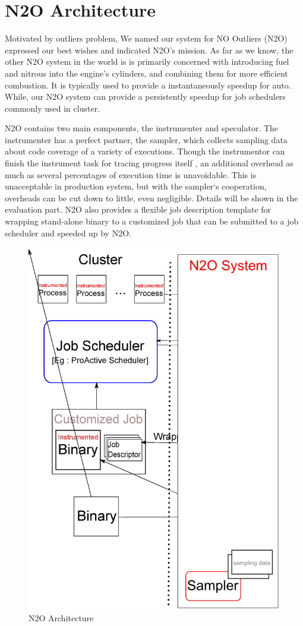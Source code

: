 \section{N2O Architecture}

Motivated by outliers problem, We named our system for NO Outliers (N2O) expressed our best wishes and indicated N2O’s mission. As far as we know, the other N2O system in the world is is primarily concerned with introducing fuel and nitrous into the engine's cylinders, and combining them for more efficient combustion. It is typically used to provide a instantaneously speedup for auto. While, our N2O system can provide a persistently speedup for job schedulers commonly used in cluster.

N2O contains two main components, the instrumenter and speculator. The instrumenter has a perfect partner, the sampler, which collects sampling data about code coverage of a variety of executions. Though the instrumentor can finish the instrument task for tracing progress itself , an additional overhead as much as several percentages of execution time is unavoidable. This is unacceptable in production system, but with the sampler‘s cooperation, overheads can be cut down to little, even negligible. Details will be shown in the evaluation part. N2O also provides a flexible job description template for wrapping stand-alone binary to a customized job that can be submitted to a job scheduler and speeded up by N2O. 

\begin{figure}
\centering
\includegraphics[width=0.62\columnwidth]{figures/N2O_arch.eps}
\caption{N2O Architecture}
\label{figure:n2oarch}
\end{figure}

